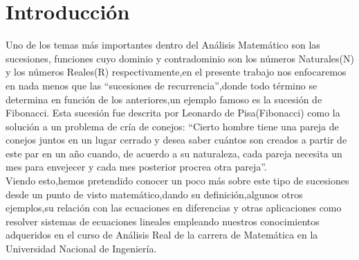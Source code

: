 \documentclass[a4paper,12pt]{article}
\begin{document}
\section{Introducción}
Uno de los temas más importantes dentro del Análisis Matemático son las sucesiones,
funciones cuyo dominio y contradominio son los números Naturales(N)
y los números Reales(R) respectivamente,en el presente trabajo nos enfocaremos
en nada menos que las ``sucesiones de recurrencia'',donde todo término se
determina en función de los anteriores,un ejemplo famoso es la sucesión de Fibonacci.
Esta sucesión fue descrita por Leonardo de Pisa(Fibonacci) como la
solución a un problema de cría de conejos: ``Cierto hombre tiene una pareja de
conejos juntos en un lugar cerrado y desea saber cuántos son creados a partir
de este par en un año cuando, de acuerdo a su naturaleza, cada pareja necesita
un mes para envejecer y cada mes posterior procrea otra pareja''.\\
Viendo esto,hemos pretendido conocer un poco más sobre este tipo de sucesiones
desde un punto de visto matemático,dando su definición,algunos otros
ejemplos,su relación con las ecuaciones en diferencias y otras aplicaciones como
resolver sistemas de ecuaciones lineales empleando nuestros conocimientos
adqueridos en el curso de Análisis Real de la carrera de Matemática en la Universidad
Nacional de Ingeniería.
\end{document}
